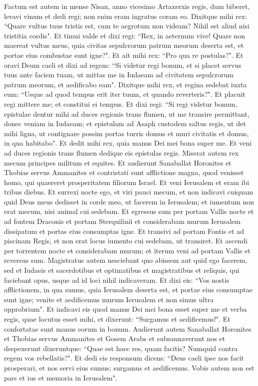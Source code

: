 \begin{biblechapter}  
\verse Factum est autem in mense Nisan, anno vicesimo Artaxerxis regis, dum biberet, levavi vinum et dedi regi; non enim eram ingratus coram eo. 
\verse Dixitque mihi rex: “Quare vultus tuus tristis est, cum te aegrotum non videam? Nihil est aliud nisi tristitia cordis". Et timui valde 
\verse et dixi regi: “Rex, in aeternum vive! Quare non maereat vultus meus, quia civitas sepulcrorum patrum meorum deserta est, et portae eius combustae sunt igne?". 
\verse Et ait mihi rex: “Pro qua re postulas?". Et oravi Deum caeli 
\verse et dixi ad regem: “Si videtur regi bonum, et si placet servus tuus ante faciem tuam, ut mittas me in Iudaeam ad civitatem sepulcrorum patrum meorum, et aedificabo eam". 
\verse Dixitque mihi rex, et regina sedebat iuxta eum: “Usque ad quod tempus erit iter tuum, et quando reverteris?". Et placuit regi mittere me; et constitui ei tempus. 
\verse Et dixi regi: “Si regi videtur bonum, epistulae dentur mihi ad duces regionis trans flumen, ut me transire permittant, donec veniam in Iudaeam; 
\verse et epistulam ad Asaph custodem saltus regis, ut det mihi ligna, ut contignare possim portas turris domus et muri civitatis et domus, in qua habitabo". Et dedit mihi rex, quia manus Dei mei bona super me. 
\verse Et veni ad duces regionis trans flumen dedique eis epistulas regis. Miserat autem rex mecum principes militum et equites. 
\verse Et audierunt Sanaballat Horonites et Thobias servus Ammanites et contristati sunt afflictione magna, quod venisset homo, qui quaereret prosperitatem filiorum Israel. 
\verse Et veni Ierusalem et eram ibi tribus diebus. 
\verse Et surrexi nocte ego, et viri pauci mecum, et non indicavi cuiquam quid Deus meus dedisset in corde meo, ut facerem in Ierusalem; et iumentum non erat mecum, nisi animal cui sedebam.  
\verse Et egressus sum per portam Vallis nocte et ad fontem Draconis et portam Sterquilinii et considerabam murum Ierusalem dissipatum et portas eius consumptas igne. 
\verse Et transivi ad portam Fontis et ad piscinam Regis, et non erat locus iumento cui sedebam, ut transiret. 
\verse Et ascendi per torrentem nocte et considerabam murum; et iterum veni ad portam Vallis et reversus sum. 
\verse Magistratus autem nesciebant quo abissem aut quid ego facerem, sed et Iudaeis et sacerdotibus et optimatibus et magistratibus et reliquis, qui faciebant opus, usque ad id loci nihil indicaveram. 
\verse Et dixi eis: “Vos nostis afflictionem, in qua sumus, quia Ierusalem deserta est, et portae eius consumptae sunt igne; venite et aedificemus murum Ierusalem et non simus ultra opprobrium". 
\verse Et indicavi eis quod manus Dei mei bona esset super me et verba regis, quae locutus esset mihi, et dixerunt: “Surgamus et aedificemus!". Et confortatae sunt manus eorum in bonum. 
\verse Audierunt autem Sanaballat Horonites et Thobias servus Ammanites et Gosem Arabs et subsannaverunt nos et despexerunt dixeruntque: “Quae est haec res, quam facitis? Numquid contra regem vos rebellatis?". 
\verse Et dedi eis responsum dicens: “Deus caeli ipse nos facit prosperari, et nos servi eius sumus; surgamus et aedificemus. Vobis autem non est pars et ius et memoria in Ierusalem". 
\end{biblechapter}

